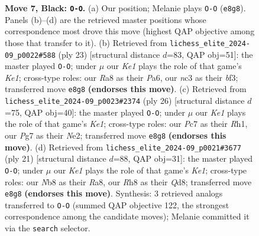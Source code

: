 \documentclass[11pt]{article}
\begin{document}
\begin{figure}[p]
\caption{\textbf{Move 7, Black: \texttt{O-O}.} (a) Our position; Melanie plays \texttt{O-O} (\texttt{e8g8}). Panels (b)--(d) are the retrieved master positions whose correspondence most drove this move (highest QAP objective among those that transfer to it). (b) Retrieved from \texttt{lichess\_elite\_2024-09\_p0022\#588} (ply 23) [structural distance $d$=83, QAP obj=51]: the master played \texttt{O-O}; under $\mu$ our \emph{Ke1} plays the role of that game's \emph{Ke1}; cross-type roles: our \emph{R}a8 as their \emph{P}a6, our \emph{n}c3 as their \emph{b}f3; transferred move \texttt{e8g8} \textbf{(endorses this move)}. (c) Retrieved from \texttt{lichess\_elite\_2024-09\_p0023\#2374} (ply 26) [structural distance $d$=75, QAP obj=40]: the master played \texttt{O-O}; under $\mu$ our \emph{Ke1} plays the role of that game's \emph{Ke1}; cross-type roles: our \emph{P}c7 as their \emph{R}h1, our \emph{P}g7 as their \emph{N}e2; transferred move \texttt{e8g8} \textbf{(endorses this move)}. (d) Retrieved from \texttt{lichess\_elite\_2024-09\_p0021\#3677} (ply 21) [structural distance $d$=88, QAP obj=31]: the master played \texttt{O-O}; under $\mu$ our \emph{Ke1} plays the role of that game's \emph{Ke1}; cross-type roles: our \emph{N}b8 as their \emph{R}a8, our \emph{R}h8 as their \emph{Q}d8; transferred move \texttt{e8g8} \textbf{(endorses this move)}. Synthesis: 3 retrieved analogs transferred to \texttt{O-O} (summed QAP objective 122, the strongest correspondence among the candidate moves); Melanie committed it via the \texttt{search} selector.}
\label{fig:thought-m13}
\end{figure}

\clearpage
\end{document}
